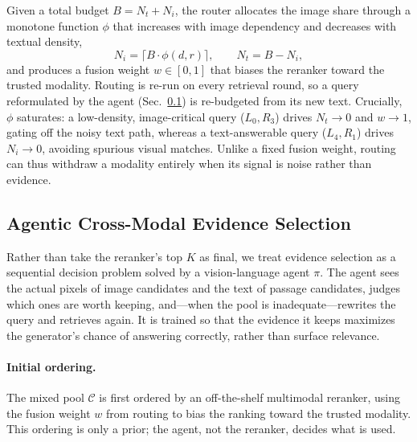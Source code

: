 Given a total budget $B=N_t+N_i$, the router allocates the image share through a
monotone function $\phi$ that increases with image dependency and decreases with
textual density,
\begin{equation}
  N_i = \big\lceil B\cdot\phi(d, r)\big\rceil,\qquad N_t = B - N_i,
  \label{eq:budget}
\end{equation}
and produces a fusion weight $w\in[0,1]$ that biases the reranker toward the
trusted modality. Routing is re-run on every retrieval round, so a query
reformulated by the agent (Sec.~\ref{sec:selection}) is re-budgeted from its new
text. Crucially, $\phi$ saturates: a
low-density, image-critical query ($L_0,R_3$) drives $N_t\!\to\!0$ and
$w\!\to\!1$, gating off the noisy text path, whereas a text-answerable query
($L_4,R_1$) drives $N_i\!\to\!0$, avoiding spurious visual matches. Unlike a
fixed fusion weight, routing can thus withdraw a modality entirely when its
signal is noise rather than evidence.

\subsection{Agentic Cross-Modal Evidence Selection}
\label{sec:selection}

Rather than take the reranker's top $K$ as final, we treat evidence selection as
a sequential decision problem solved by a vision-language agent $\pi$. The agent
sees the actual pixels of image candidates and the text of passage candidates,
judges which ones are worth keeping, and---when the pool is inadequate---rewrites
the query and retrieves again. It is trained so that the evidence it keeps
maximizes the generator's chance of answering correctly, rather than surface
relevance.

\paragraph{Initial ordering.}
The mixed pool $\mathcal{C}$ is first ordered by an off-the-shelf multimodal
reranker, using the fusion weight $w$ from routing to bias the ranking toward the
trusted modality. This ordering is only a prior; the agent, not the reranker,
decides what is used.

